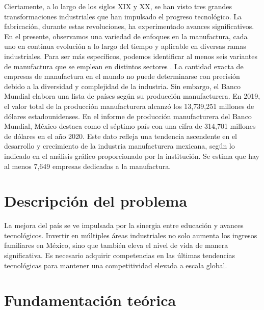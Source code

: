 Ciertamente, a lo largo de los siglos XIX y XX, se han visto tres grandes transformaciones industriales que han impulsado el progreso tecnológico. La fabricación, durante estas revoluciones, ha experimentado avances significativos. En el presente, observamos una variedad de enfoques en la manufactura, cada uno en continua evolución a lo largo del tiempo y aplicable en diversas ramas industriales. 
Para ser más específicos, podemos identificar al menos seis variantes de manufactura que se emplean en distintos sectores \cite{industrialrevolutions}.
La cantidad exacta de empresas de manufactura en el mundo no puede determinarse con precisión debido a la diversidad y complejidad de la industria. Sin embargo, el Banco Mundial elabora una lista de países según su producción manufacturera. En 2019, el valor total de la producción manufacturera alcanzó los 13,739,251 millones de dólares estadounidenses.
En el informe de producción manufacturera del Banco Mundial, México destaca como el séptimo país con una cifra de 314,701 millones de dólares en el año 2020. Este dato refleja una tendencia ascendente en el desarrollo y crecimiento de la industria manufacturera mexicana, según lo indicado en el análisis gráfico proporcionado por la institución.
Se estima que hay al menos 7,649 empresas dedicadas a la manufactura.


    
    
    \section{Descripción del problema}
 
La mejora del país se ve impulsada por la sinergia entre educación y avances tecnológicos. Invertir en múltiples áreas industriales no solo aumenta los ingresos familiares en México, sino que también eleva el nivel de vida de manera significativa.
Es necesario adquirir competencias en las últimas tendencias tecnológicas para mantener una competitividad elevada a escala global.
   
 
    \section{Fundamentación teórica}
    


